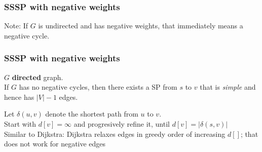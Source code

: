   \begin{frame}[fragile]
  \frametitle{SSSP with negative weights}
Note: If $G$ is undirected and has negative weights, that immediately means a negative cycle. 
  \end{frame}


  \begin{frame}[fragile]
  \frametitle{SSSP with negative weights}
  $G$ {\bf directed} graph. \\
   If $G$ has no negative cycles, then there exists a SP from
  $s$ to $v$ that is \emph{simple} and hence has $|V|-1$ edges.
   
  Let $\delta(u,v)$ denote the shortest path from $u$ to $v$. \\
  Start with $d[v] = \infty$ and progresively refine it, until $d[v] = |\delta(s,v)|$\\
  Similar to Dijkstra:  Dijkstra relaxes edges in greedy order of increasing $d[]$; that does
  not work for negative edges
 \end{frame} 





